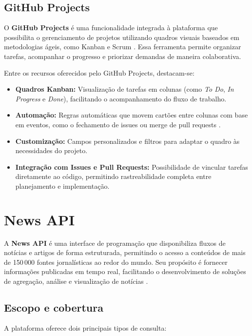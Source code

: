 \subsection{GitHub Projects}
\label{subsec:github-projects}

O \textbf{GitHub Projects} é uma funcionalidade integrada à plataforma que possibilita o gerenciamento de projetos utilizando quadros visuais baseados em metodologias ágeis, como Kanban e Scrum \cite{github_projects}. Essa ferramenta permite organizar tarefas, acompanhar o progresso e priorizar demandas de maneira colaborativa.

Entre os recursos oferecidos pelo GitHub Projects, destacam-se:

\begin{itemize}
\item \textbf{Quadros Kanban:} Visualização de tarefas em colunas (como \textit{To Do}, \textit{In Progress} e \textit{Done}), facilitando o acompanhamento do fluxo de trabalho.
\item \textbf{Automação:} Regras automáticas que movem cartões entre colunas com base em eventos, como o fechamento de issues ou merge de pull requests \cite{github_projects}.
\item \textbf{Customização:} Campos personalizados e filtros para adaptar o quadro às necessidades do projeto.
\item \textbf{Integração com Issues e Pull Requests:} Possibilidade de vincular tarefas diretamente ao código, permitindo rastreabilidade completa entre planejamento e implementação.
\end{itemize}






\section{News API}
\label{sec:news-api}

A \textbf{News API} é uma interface de programação que disponibiliza fluxos de notícias e artigos de forma estruturada, permitindo o acesso a conteúdos de mais de 150\,000 fontes jornalísticas ao redor do mundo. Seu propósito é fornecer informações publicadas em tempo real, facilitando o desenvolvimento de soluções de agregação, análise e visualização de notícias \cite{newsapi_docs}.

\subsection{Escopo e cobertura}
A plataforma oferece dois principais tipos de consulta: 

